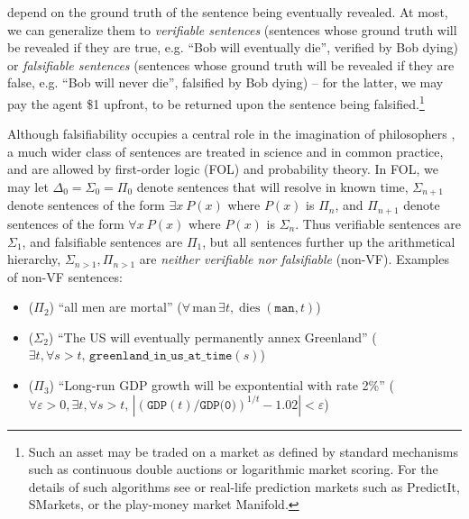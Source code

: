  depend on the ground truth of the sentence being eventually revealed. At most, we can generalize them to \emph{verifiable sentences} (sentences whose ground truth will be revealed if they are true, e.g. ``Bob will eventually die'', verified by Bob dying) or \emph{falsifiable sentences} (sentences whose ground truth will be revealed if they are false, e.g. ``Bob will never die'', falsified by Bob dying) -- for the latter, we may pay the agent \$1 upfront, to be returned upon the sentence being falsified.\footnote{Such an asset may be traded on a market as defined by standard mechanisms such as continuous double auctions or logarithmic market scoring. For the details of such algorithms see \citet{conitzerPredictionMarketsMechanism2012, hansonLogarithmicMarketScoring2002, hansonCombinatorialInformationMarket2003} or real-life prediction markets such as PredictIt, SMarkets, or the play-money market Manifold.} %

Although falsifiability occupies a central role in the imagination of philosophers \citep{thorntonKarlPopper2023}, a much wider class of sentences are treated in science and in common practice, and are allowed by first-order logic (FOL) and probability theory. In FOL, we may let $\Delta_0=\Sigma_0=\Pi_0$ denote sentences that will resolve in known time, $\Sigma_{n+1}$ denote sentences of the form $\exists x\ P(x)$ where $P(x)$ is $\Pi_n$, and $\Pi_{n+1}$ denote sentences of the form $\forall x\ P(x)$ where $P(x)$ is $\Sigma_n$. Thus verifiable sentences are $\Sigma_1$, and falsifiable sentences are $\Pi_1$, but all sentences further up the arithmetical hierarchy, $\Sigma_{n>1},\Pi_{n>1}$ are \emph{neither verifiable nor falsifiable} (non-VF). Examples of non-VF sentences:
\begin{itemize}
  \item ($\Pi_2$) ``all men are mortal'' ($\forall\,\mathrm{man}\,\exists t,\operatorname{dies}(\texttt{man}, t)$)
  \item ($\Sigma_2$) ``The US will eventually permanently annex Greenland'' ($\exists t,\forall s>t,\,\texttt{greenland\_in\_us\_at\_time}(s)$)
  \item ($\Pi_3$) ``Long-run GDP growth will be expontential with rate 2\%'' ($\forall\varepsilon>0,\exists t, \forall s>t, \,|\left(\texttt{GDP}(t)/\texttt{GDP(0)}\right)^{1/t}-1.02|<\varepsilon$)
\end{itemize}

